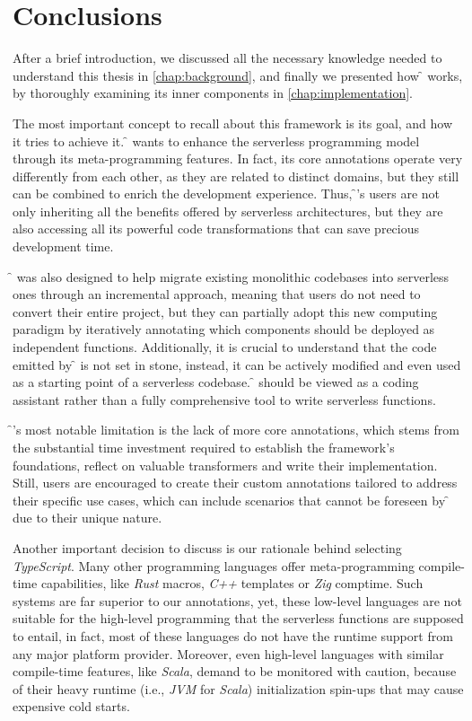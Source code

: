 \chapter{Conclusions}
\label{chap:conclusion}

After a brief introduction, we discussed all the necessary knowledge needed
to understand this thesis in \cref{chap:background}, and finally we presented
how \f{} works, by thoroughly examining its inner components in \cref{chap:implementation}.

The most important concept to recall about this framework is its goal, and how it tries to achieve it.
\f{} wants to enhance the serverless programming model through its meta-programming
features. In fact, its core annotations operate very differently from each other,
as they are related to distinct domains, but they still can be combined
to enrich the development experience.
Thus, \f{}'s users are not only inheriting all the
benefits offered by serverless architectures,
but they are also accessing all its powerful code
transformations that can save precious development time.

\f{} was also designed to help migrate existing
monolithic codebases into serverless ones through an incremental approach,
meaning that users do not need to convert their entire project, but they
can partially adopt this new computing paradigm by iteratively annotating which
components should be deployed as independent functions.
Additionally, it is crucial to understand that the code
emitted by \f{} is not set in stone, instead, it can be actively modified
and even used as a starting point of a serverless codebase.
\f{} should be viewed as a coding assistant rather than a fully comprehensive tool to write serverless functions.

\f{}'s most notable limitation is the lack of more core annotations,
which stems from the substantial time investment required
to establish the framework's foundations, reflect on valuable transformers and write their implementation.
Still, users are encouraged to create their custom annotations
tailored to address their specific use cases, which can include scenarios
that cannot be foreseen by \f{} due to their unique nature.

Another important decision to discuss is our rationale behind selecting \textit{TypeScript}.
Many other programming languages offer meta-programming compile-time capabilities,
like \textit{Rust} macros, \textit{C++} templates or \textit{Zig} comptime.
Such systems are far superior to our annotations, yet,
these low-level languages are not suitable for the high-level programming
that the serverless functions are supposed to entail, in fact, most of these languages
do not have the runtime support from any major platform provider.
Moreover, even high-level languages with similar compile-time features, like \textit{Scala},
demand to be monitored with caution, because of their heavy
runtime (i.e., \textit{JVM} for \textit{Scala}) initialization spin-ups
that may cause expensive cold starts.

